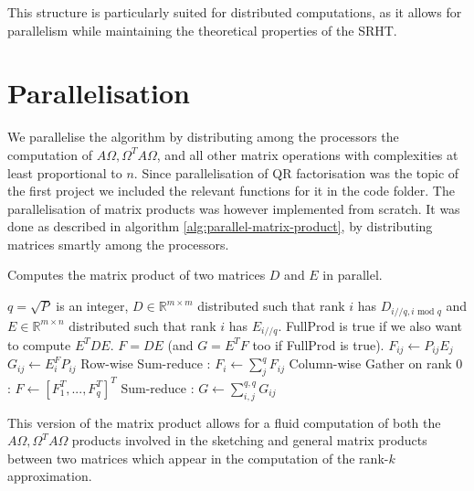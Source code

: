 \documentclass[a4paper, 12pt,oneside]{article}
\begin{document}
	This structure is particularly suited for distributed computations, as it allows for parallelism while maintaining the theoretical properties of the SRHT.
	\section{Parallelisation}
	We parallelise the algorithm by distributing among the processors the computation of $A \Omega,\Omega^T A \Omega$, and all other matrix operations with complexities at least proportional to $n$. 
	Since parallelisation of QR factorisation was the topic of the first project we included the relevant functions for it in the code folder. The parallelisation of matrix products was however implemented from scratch. It was done as described in algorithm \ref{alg:parallel-matrix-product}, by distributing matrices smartly among the processors. 
	\begin{algorithm}[H]
		\caption{Computes the matrix product of two matrices $D$ and $E$ in parallel.}\label{alg:parallel-matrix-product}
		\begin{algorithmic}
		\Require $q=\sqrt{P}$ is an integer, $D\in\mathbb R^{m\times m}$  distributed such that rank $i$ has $D_{i//q,i\text{ mod }q}$ and $E\in\mathbb R^{m\times n}$ distributed such that rank $i$ has $E_{i//q}$. FullProd is true if we also want to compute $E^TDE$.
		\Ensure $F=DE$ (and $G=E^TF$ too if FullProd is true). 
		\State $F_{ij} \gets P_{ij}E_j$
			\State $G_{ij} \gets E_i^FP_{ij}$
		\EndIf		
		\State Row-wise Sum-reduce : $F_i\gets \sum_j^q F_{ij}$
		\State Column-wise Gather on rank 0 : $F\gets [F_1^T,...,F_q^T]^T$
			\State Sum-reduce : $G\gets \sum_{i,j}^{q,q} G_{ij}$
		\EndIf
		\end{algorithmic}
	\end{algorithm}
	This version of the matrix product allows for a fluid computation of both the $A \Omega,\Omega^T A \Omega$ products involved in the sketching and general matrix products between two matrices which appear in the computation of the rank-$k$ approximation. 
	
\end{document}
